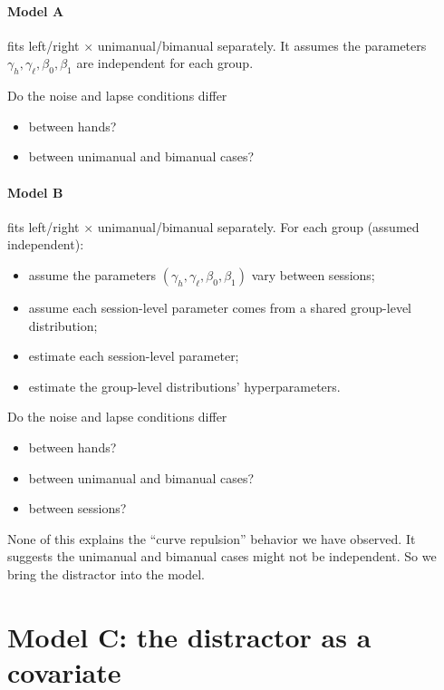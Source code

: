 \documentclass[11pt]{article}
\begin{document}
\paragraph{Model A} fits left/right $\times$ unimanual/bimanual separately. It assumes
the parameters $\gamma_h, \gamma_\ell, \beta_0, \beta_1$ are independent for each group.
\begin{aside}
Do the noise and lapse conditions differ
\begin{itemize}[nosep]
  \item between hands?
  \item between unimanual and bimanual cases?
\end{itemize}
\end{aside}

\paragraph{Model B} fits left/right $\times$ unimanual/bimanual separately. For each
group (assumed independent):
\begin{itemize}[nosep]
  \item assume the parameters $(\gamma_h, \gamma_\ell, \beta_0, \beta_1)$ vary between sessions;
  \item assume each session-level parameter comes from a shared group-level distribution;
  \item estimate each session-level parameter;
  \item estimate the group-level distributions' hyperparameters.
\end{itemize}
\begin{aside}
Do the noise and lapse conditions differ
\begin{itemize}[nosep]
  \item between hands?
  \item between unimanual and bimanual cases?
  \item between sessions?
\end{itemize}
\end{aside}

None of this explains the ``curve repulsion'' behavior we have observed. It suggests
the unimanual and bimanual cases might not be independent. So we bring the
distractor into the model.

\section{Model C: the distractor as a covariate}
\end{document}
